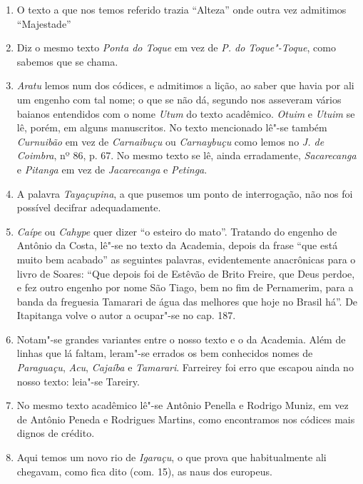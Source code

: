 \begin{enumerate}
\item O texto a que nos temos referido trazia ``Alteza'' onde outra vez admitimos ``Majestade'' 

\item Diz o mesmo texto \textit{Ponta do Toque}  em vez de \textit{P. do Toque"-Toque}, como 
sabemos que se chama.

\item \textit{Aratu} lemos num dos códices, e admitimos a lição, ao saber que havia por ali um 
engenho com tal nome; o que se não dá, segundo nos asseveram vários baianos 
entendidos com o nome \textit{Utum} do texto acadêmico. \textit{Otuim} e \textit{Utuim} se lê, porém, 
em alguns manuscritos. No texto mencionado lê"-se também \textit{Curnuibão} em vez de 
\textit{Carnaibuçu} ou \textit{Carnaybuçu}  como lemos no \textit{J. de Coimbra}, nº 86, p. 67.
No mesmo texto se lê, ainda erradamente, \textit{Sacarecanga} e \textit{Pitanga} em vez de \textit{Jacarecanga} 
e \textit{Petinga}.

\item A palavra \textit{Tayaçupina}, a que pusemos um ponto de interrogação, não  nos foi 
possível decifrar adequadamente.

\item \textit{Caípe} ou \textit{Cahype} quer dizer ``o esteiro do mato''.  Tratando do engenho de Antônio da 
Costa, lê"-se no texto da Academia, depois da frase ``que está muito bem acabado''  as 
seguintes palavras, evidentemente anacrônicas para o livro de Soares: ``Que depois 
foi de Estêvão de Brito Freire, que Deus perdoe, e fez 
outro engenho por nome São Tiago, bem no fim de Pernamerim, para a banda da freguesia 
Tamarari de água das melhores que hoje no Brasil há''.  De Itapitanga volve o autor a 
ocupar"-se no cap. 187.

\item  Notam"-se grandes variantes entre o nosso texto e o da Academia.
Além de linhas que lá faltam, leram"-se errados os bem conhecidos nomes
de \textit{Paraguaçu}, \textit{Acu}, \textit{Cajaíba} e \textit{Tamarari}. Farreirey foi erro que escapou
ainda no nosso texto: leia"-se Tareiry.

\item No mesmo texto acadêmico lê"-se Antônio Penella e Rodrigo Muniz, em vez de 
Antônio Peneda e Rodrigues Martins, como encontramos nos códices mais dignos de 
crédito.

\item Aqui temos um novo rio de \textit{Igaraçu}, o que prova que habitualmente ali 
chegavam, como fica dito (com. 15), as naus dos europeus.


\end{enumerate}
